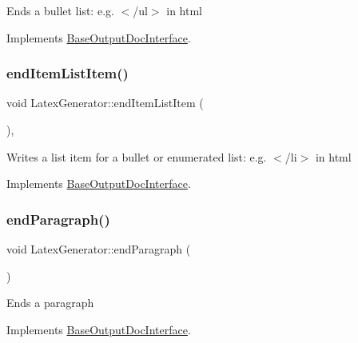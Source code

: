 Ends a bullet list\+: e.\+g. {\ttfamily $<$/ul$>$} in html 

Implements \mbox{\hyperlink{class_base_output_doc_interface_a3493b65672bf134033bd3bb296acdff4}{Base\+Output\+Doc\+Interface}}.

\mbox{\label{class_latex_generator_a32c196e3b968d56ed445bb3bc090ca6b}} 
\subsubsection{\texorpdfstring{endItemListItem()}{endItemListItem()}}
{\footnotesize\ttfamily void Latex\+Generator\+::end\+Item\+List\+Item (\begin{DoxyParamCaption}{ }\end{DoxyParamCaption})\hspace{0.3cm}{\ttfamily [inline]}, {\ttfamily [virtual]}}

Writes a list item for a bullet or enumerated list\+: e.\+g. {\ttfamily $<$/li$>$} in html 

Implements \mbox{\hyperlink{class_base_output_doc_interface_a90d290d7a06a9e7ecd968c8da90ed665}{Base\+Output\+Doc\+Interface}}.

\mbox{\label{class_latex_generator_a725c87d183be3801d4ceecb793ecb458}} 
\subsubsection{\texorpdfstring{endParagraph()}{endParagraph()}}
{\footnotesize\ttfamily void Latex\+Generator\+::end\+Paragraph (\begin{DoxyParamCaption}{ }\end{DoxyParamCaption})\hspace{0.3cm}{\ttfamily [virtual]}}

Ends a paragraph 

Implements \mbox{\hyperlink{class_base_output_doc_interface_ab76280c2eb451ad160991707206b6c95}{Base\+Output\+Doc\+Interface}}.

\mbox{\label{class_latex_generator_a40c84d4660b7514fb336c18544005b52}} 
